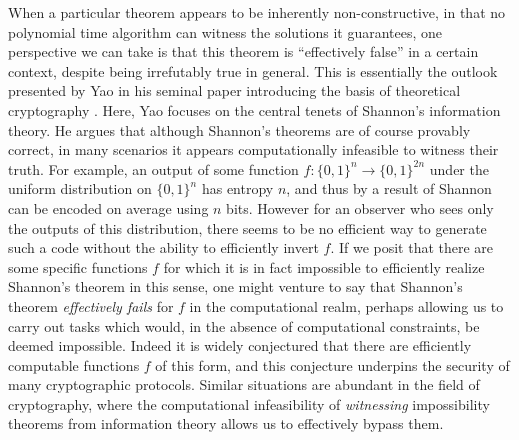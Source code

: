 \documentclass[11pt]{article}
\newcommand{\B}{\{0,1\}}
\begin{document}
When a particular theorem appears to be inherently non-constructive, in that no polynomial time algorithm can witness the solutions it guarantees, one perspective we can take is that this theorem is ``effectively false'' in a certain context, despite being irrefutably true in general. This is essentially the outlook presented by Yao in his seminal paper introducing the basis of theoretical cryptography \cite{Yao}. Here, Yao focuses on the central tenets of Shannon's information theory.
He argues that although Shannon's theorems are of course provably correct, in many scenarios it appears computationally infeasible to witness their truth. For example, an output of some function $f \colon\B^n \rightarrow \B^{2n}$ under the uniform distribution on $\B^n$ has entropy $n$, and thus by a result of Shannon can be encoded on average using $n$ bits. However for an observer who sees only the outputs of this distribution, there seems to be no efficient way to generate such a code without the ability to efficiently invert $f$. If we posit that there are some specific functions $f$ for which it is in fact impossible to efficiently realize Shannon's theorem in this sense, one might venture to say that Shannon's theorem \emph{effectively fails} for $f$ in the computational realm, perhaps allowing us to carry out tasks which would, in the absence of computational constraints, be deemed impossible. Indeed it is widely conjectured that there are efficiently computable functions $f$ of this form, and this conjecture underpins the security of many cryptographic protocols. Similar situations are abundant in the field of cryptography, where the computational infeasibility of \emph{witnessing} impossibility theorems from information theory allows us to effectively bypass them.
\end{document}
